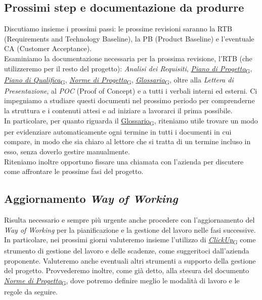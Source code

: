 \documentclass[italian,12pt]{article} %
\begin{document}
\subsection{Prossimi step e documentazione da produrre}
Discutiamo insieme i prossimi passi: le prossime revisioni saranno la RTB
(Requirements and Technology Baseline), la PB (Product Baseline) e l'eventuale CA
(Customer Acceptance).\\
Esaminiamo la documentazione necessaria per la prossima revisione, l'RTB (che
utilizzeremo per il resto del progetto): \textit{Analisi dei Requisiti},
\href{https://7last.github.io/docs/rtb/documentazione-interna/glossario\#piano-di-progetto}{\textit{Piano di Progetto}\textsubscript{G}}, \href{https://7last.github.io/docs/rtb/documentazione-interna/glossario\#piano-di-qualifica}{\textit{Piano di Qualifica}\textsubscript{G}}, \href{https://7last.github.io/docs/rtb/documentazione-interna/glossario\#norme-di-progetto}{\textit{Norme di Progetto}\textsubscript{G}},
\href{https://7last.github.io/docs/rtb/documentazione-interna/glossario\#glossario}{\textit{Glossario}\textsubscript{G}},  oltre alla \textit{Lettera di Presentazione}, al \textit{POC}
(Proof of Concept) e a tutti i verbali interni ed esterni. Ci impegniamo a studiare
questi documenti nel prossimo periodo per comprenderne la struttura e i contenuti
attesi e ad iniziare a lavorarci il prima possibile. \\
In particolare, per quanto riguarda il \href{https://7last.github.io/docs/rtb/documentazione-interna/glossario\#glossario}{Glossario\textsubscript{G}}, riteniamo utile trovare un modo
per evidenziare automaticamente ogni termine in tutti i documenti in cui compare,
in modo che sia chiaro al lettore che si tratta di un termine incluso in esso,
senza doverlo gestire manualmente. \\
Riteniamo inoltre opportuno fissare una chiamata con l'azienda per discutere
come affrontare le prossime fasi del progetto.

\subsection{Aggiornamento \textit{Way of Working}}
Risulta necessario e sempre più urgente anche procedere con l'aggiornamento del
\textit{Way of Working} per la pianificazione e la gestione del lavoro nelle fasi
successive. \\
In particolare, nei prossimi giorni valuteremo insieme l'utilizzo di \href{https://7last.github.io/docs/rtb/documentazione-interna/glossario\#clickup}{\textit{ClickUp}\textsubscript{G}}
come strumento di gestione del lavoro e delle scadenze, come suggeritoci
dall'azienda proponente. Valuteremo anche eventuali altri strumenti a supporto della
gestione del progetto. Provvederemo inoltre, come già detto, alla stesura del
documento \href{https://7last.github.io/docs/rtb/documentazione-interna/glossario\#norme-di-progetto}{\textit{Norme di Progetto}\textsubscript{G}}, dove potremo definire meglio le modalità di
lavoro e le regole da seguire.
\end{document}

